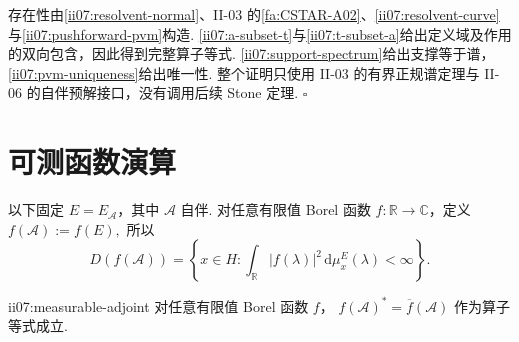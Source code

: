 \begin{FAProof}
存在性由\autoref{ii07:resolvent-normal}、II-03 的\autoref{fa:CSTAR-A02}、\autoref{ii07:resolvent-curve}与\autoref{ii07:pushforward-pvm}构造. \autoref{ii07:a-subset-t}与\autoref{ii07:t-subset-a}给出定义域及作用的双向包含，因此得到完整算子等式. \autoref{ii07:support-spectrum}给出支撑等于谱，\autoref{ii07:pvm-uniqueness}给出唯一性. 整个证明只使用 II-03 的有界正规谱定理与 II-06 的自伴预解接口，没有调用后续 Stone 定理.
\hfill\(\square\)
\end{FAProof}

\section{可测函数演算}\label{sec:ii07-measurable-calculus}

以下固定 \(\displaystyle E=E_{\mathcal A}\)，其中 \(\displaystyle\mathcal A\) 自伴. 对任意有限值 Borel 函数 \(\displaystyle f:\mathbb R\to\mathbb C\)，定义
\(\displaystyle f(\mathcal A):=f(E),\)
所以
\[
D(f(\mathcal A))
=
\left\{
 x\in H:
 \int_{\mathbb R}|f(\lambda)|^2\,\mathrm{d}\mu_x^E(\lambda)<\infty
\right\}.
\]

\begin{FAProposition}[B][可测函数演算的伴随公式]{ii07:measurable-adjoint}
对任意有限值 Borel 函数 \(\displaystyle f\)，
\(\displaystyle f(\mathcal A)^*=\overline f(\mathcal A)\)
作为算子等式成立.
\end{FAProposition}

